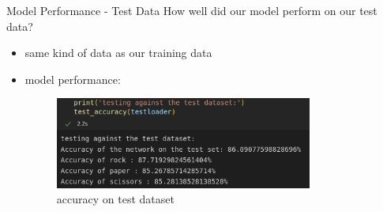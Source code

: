 \documentclass[aspectratio=169]{beamer}
\begin{document}
{	\begin{frame}{Model Performance - Test Data}
	How well did our model perform on our test data?
	\begin{itemize}
		\item same kind of data as our training data
		\pause
		\item model performance:
		\newline
		\begin{figure}
			\centering
			\includegraphics[width=0.8\textwidth]{img/TestAccuracyRPS_10.png}
			\caption{accuracy on test dataset}
		\end{figure}   
	\end{itemize}
	\end{frame}
	
}
\end{document}
